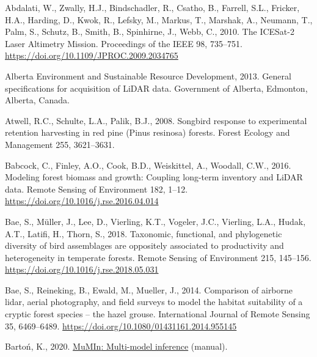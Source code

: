 \documentclass[
]{article}
\newlength{\cslhangindent}
\newlength{\cslentryspacingunit} %
\newenvironment{CSLReferences}[2] %
 {%
  \setlength{\parindent}{0pt}
  \ifodd #1
  \let\oldpar\par
  \def\par{\hangindent=\cslhangindent\oldpar}
  \fi
  \setlength{\parskip}{#2\cslentryspacingunit}
 }%
 {}
\begin{document}
\hypertarget{refs}{}
\begin{CSLReferences}{1}{0}
\leavevmode{}%
Abdalati, W., Zwally, H.J., Bindschadler, R., Csatho, B., Farrell, S.L., Fricker, H.A., Harding, D., Kwok, R., Lefsky, M., Markus, T., Marshak, A., Neumann, T., Palm, S., Schutz, B., Smith, B., Spinhirne, J., Webb, C., 2010. The {ICESat}-2 {Laser} {Altimetry} {Mission}. Proceedings of the IEEE 98, 735--751. \url{https://doi.org/10.1109/JPROC.2009.2034765}

\leavevmode{}%
Alberta Environment and Sustainable Resource Development, 2013. General specifications for acquisition of {LiDAR} data. Government of Alberta, Edmonton, Alberta, Canada.

\leavevmode{}%
Atwell, R.C., Schulte, L.A., Palik, B.J., 2008. Songbird response to experimental retention harvesting in red pine ({Pinus} resinosa) forests. Forest Ecology and Management 255, 3621--3631.

\leavevmode{}%
Babcock, C., Finley, A.O., Cook, B.D., Weiskittel, A., Woodall, C.W., 2016. Modeling forest biomass and growth: {Coupling} long-term inventory and {LiDAR} data. Remote Sensing of Environment 182, 1--12. \url{https://doi.org/10.1016/j.rse.2016.04.014}

\leavevmode{}%
Bae, S., Müller, J., Lee, D., Vierling, K.T., Vogeler, J.C., Vierling, L.A., Hudak, A.T., Latifi, H., Thorn, S., 2018. Taxonomic, functional, and phylogenetic diversity of bird assemblages are oppositely associated to productivity and heterogeneity in temperate forests. Remote Sensing of Environment 215, 145--156. \url{https://doi.org/10.1016/j.rse.2018.05.031}

\leavevmode{}%
Bae, S., Reineking, B., Ewald, M., Mueller, J., 2014. Comparison of airborne lidar, aerial photography, and field surveys to model the habitat suitability of a cryptic forest species -- the hazel grouse. International Journal of Remote Sensing 35, 6469--6489. \url{https://doi.org/10.1080/01431161.2014.955145}

\leavevmode{}%
Bartoń, K., 2020. \href{https://CRAN.R-project.org/package=MuMIn}{{MuMIn}: {Multi}-model inference} (manual).


\end{CSLReferences}
\end{document}
